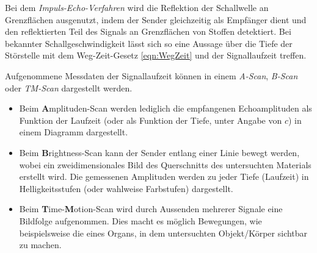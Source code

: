 Bei dem \textit{Impuls-Echo-Verfahren} wird die Reflektion der Schallwelle an Grenzflächen ausgenutzt, indem der Sender gleichzeitig als Empfänger dient und den 
reflektierten Teil des Signals an Grenzflächen von Stoffen detektiert. Bei bekannter Schallgeschwindigkeit lässt sich so eine Aussage über die Tiefe der Störstelle 
mit dem Weg-Zeit-Gesetz \eqref{eqn:WegZeit} und der Signallaufzeit treffen.

Aufgenommene Messdaten der Signallaufzeit können in einem \textit{A-Scan}, \textit{B-Scan} oder \textit{TM-Scan} dargestellt werden.
\begin{itemize}
    \item{Beim \textbf{A}mplituden-Scan werden lediglich die empfangenen Echoamplituden als Funktion der Laufzeit (oder als Funktion der Tiefe, unter Angabe von $c$)
    in einem Diagramm dargestellt.}
    \item{Beim \textbf{B}rightness-Scan kann der Sender entlang einer Linie bewegt werden, wobei ein zweidimensionales Bild des Querschnitts des untersuchten Materials
    erstellt wird. Die gemessenen Amplituden werden zu jeder Tiefe (Laufzeit) in Helligkeitsstufen (oder wahlweise Farbstufen) dargestellt.}
    \item{Beim \textbf{T}ime-\textbf{M}otion-Scan wird durch Aussenden mehrerer Signale eine Bildfolge aufgenommen. Dies macht es möglich Bewegungen, wie beispielsweise 
    die eines Organs, in dem untersuchten Objekt/Körper sichtbar zu machen.}
\end{itemize}
